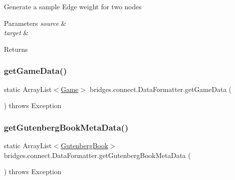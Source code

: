 Generate a sample Edge weight for two nodes 
\begin{DoxyParams}{Parameters}
{\em source} & \\
\hline
{\em target} & \\
\hline
\end{DoxyParams}
\begin{DoxyReturn}{Returns}

\end{DoxyReturn}
\mbox{\label{classbridges_1_1connect_1_1_data_formatter_a4098317468be22b4284156d6cd2212e1}} 
\subsubsection{\texorpdfstring{get\+Game\+Data()}{getGameData()}}
{\footnotesize\ttfamily static Array\+List$<$\mbox{\hyperlink{classbridges_1_1data__src__dependent_1_1_game}{Game}}$>$ bridges.\+connect.\+Data\+Formatter.\+get\+Game\+Data (\begin{DoxyParamCaption}{ }\end{DoxyParamCaption}) throws Exception\hspace{0.3cm}{\ttfamily [static]}}

\mbox{\label{classbridges_1_1connect_1_1_data_formatter_a4bd21bd830238db40b511474afc77b61}} 
\subsubsection{\texorpdfstring{get\+Gutenberg\+Book\+Meta\+Data()}{getGutenbergBookMetaData()}}
{\footnotesize\ttfamily static Array\+List$<$\mbox{\hyperlink{classbridges_1_1data__src__dependent_1_1_gutenberg_book}{Gutenberg\+Book}}$>$ bridges.\+connect.\+Data\+Formatter.\+get\+Gutenberg\+Book\+Meta\+Data (\begin{DoxyParamCaption}{ }\end{DoxyParamCaption}) throws Exception\hspace{0.3cm}{\ttfamily [static]}}

